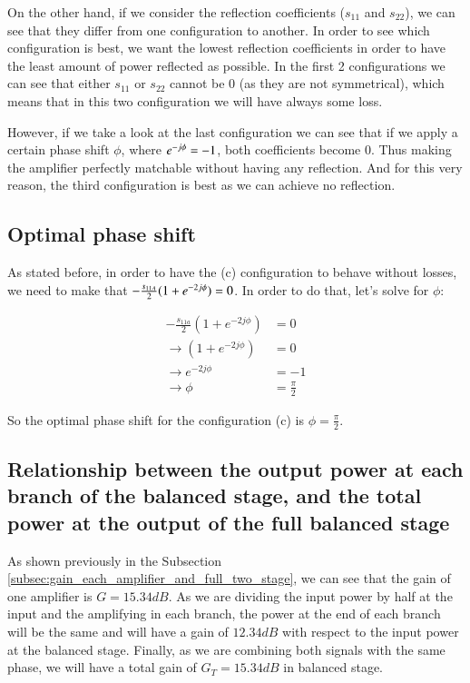 \documentclass[12pt]{report} %
\begin{document}
On the other hand, if we consider the reflection coefficients ($s_{11}$ and $s_{22}$), we can see that they differ from one configuration to another. In order to see which configuration is best, we want the lowest reflection coefficients in order to have the least amount of power reflected as possible. In the first 2 configurations we can see that either $s_{11}$ or $s_{22}$ cannot be 0 (as they are not symmetrical), which means that in this two configuration we will have always some loss.

However, if we take a look at the last configuration we can see that if we apply a certain phase shift $\phi$, where $e^{- j \* \phi} = -1$, both coefficients become 0. Thus making the amplifier perfectly matchable without having any reflection. And for this very reason, the third configuration is best as we can achieve no reflection.

\subsection{Optimal phase shift}

As stated before, in order to have the (c) configuration to behave without losses, we need to make that $- \frac{s_{11A}}{2} \* (1 + e^{-2 \* j \* \phi}) = 0$. In order to do that, let's solve for $\phi$:

\begin{align*}
- \frac{s_{11a}}{2} (1 + e^{-2j\phi}) &= 0 \\
\rightarrow (1 + e^{-2j\phi}) &= 0 \\
\rightarrow e^{-2j\phi} &= -1 \\
\rightarrow \phi &= \frac{\pi}{2}
\end{align*}

So the optimal phase shift for the configuration (c) is $\phi = \frac{\pi}{2}$.

\subsection{Relationship between the output power at each branch of the balanced stage, and the total power at the output of the full balanced stage}

As shown previously in the Subsection \ref{subsec:gain_each_amplifier_and_full_two_stage}, we can see that the gain of one amplifier is $G = 15.34 dB$. As we are dividing the input power by half at the input and the amplifying in each branch, the power at the end of each branch will be the same and will have a gain of $12.34 dB$ with respect to the input power at the balanced stage. Finally, as we are combining both signals with the same phase, we will have a total gain of $G_T = 15.34 dB$ in balanced stage.
\end{document}
